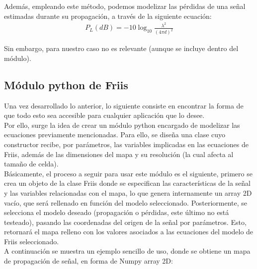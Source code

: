 Además, empleando este método, podemos modelizar las pérdidas de una señal estimadas durante su propagación, a través de la siguiente ecuación:\\

\begin{align}
    P_L(dB) = -10 \log_{10} \frac{\lambda^2}{(4 \pi d)^2}
\end{align}

Sin embargo, para nuestro caso no es relevante (aunque se incluye dentro del módulo).\\

\subsection{Módulo python de Friis}
\label{subsec:friis-module}

Una vez desarrollado lo anterior, lo siguiente consiste en encontrar la forma de que todo esto sea accesible para cualquier aplicación que lo desee.\\

Por ello, surge la idea de crear un módulo python encargado de modelizar las ecuaciones previamente mencionadas. Para ello, se diseña una clase cuyo constructor recibe, por parámetros, las variables implicadas en las ecuaciones de Friis, además de las dimensiones del mapa y su resolución (la cual afecta al tamaño de celda).\\

Básicamente, el proceso a seguir para usar este módulo es el siguiente, primero se crea un objeto de la clase Friis donde se especifican las características de la señal y las variables relacionadas con el mapa, lo que genera internamente un array 2D vacío, que será rellenado en función del modelo seleccionado. Posteriormente, se selecciona el modelo deseado (propagación o pérdidas, este último no está testeado), pasando las coordenadas del origen de la señal por parámetros. Esto, retornará el mapa relleno con los valores asociados a las ecuaciones del modelo de Friis seleccionado.\\

A continuación se muestra un ejemplo sencillo de uso, donde se obtiene un mapa de propagación de señal, en forma de Numpy array 2D:

